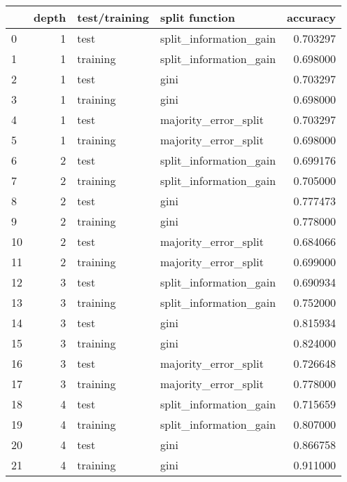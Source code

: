 \begin{tabular}{lrllr}
\toprule
{} &  depth & test/training &          split function &  accuracy \\
\midrule
0  &      1 &          test &  split\_information\_gain &  0.703297 \\
1  &      1 &      training &  split\_information\_gain &  0.698000 \\
2  &      1 &          test &                    gini &  0.703297 \\
3  &      1 &      training &                    gini &  0.698000 \\
4  &      1 &          test &    majority\_error\_split &  0.703297 \\
5  &      1 &      training &    majority\_error\_split &  0.698000 \\
6  &      2 &          test &  split\_information\_gain &  0.699176 \\
7  &      2 &      training &  split\_information\_gain &  0.705000 \\
8  &      2 &          test &                    gini &  0.777473 \\
9  &      2 &      training &                    gini &  0.778000 \\
10 &      2 &          test &    majority\_error\_split &  0.684066 \\
11 &      2 &      training &    majority\_error\_split &  0.699000 \\
12 &      3 &          test &  split\_information\_gain &  0.690934 \\
13 &      3 &      training &  split\_information\_gain &  0.752000 \\
14 &      3 &          test &                    gini &  0.815934 \\
15 &      3 &      training &                    gini &  0.824000 \\
16 &      3 &          test &    majority\_error\_split &  0.726648 \\
17 &      3 &      training &    majority\_error\_split &  0.778000 \\
18 &      4 &          test &  split\_information\_gain &  0.715659 \\
19 &      4 &      training &  split\_information\_gain &  0.807000 \\
20 &      4 &          test &                    gini &  0.866758 \\
21 &      4 &      training &                    gini &  0.911000 \\

\end{tabular}
